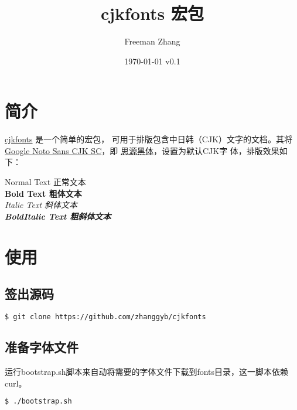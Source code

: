 \documentclass[oneside,final]{article}
\begin{document}
\title{cjkfonts 宏包}
\author{Freeman Zhang}
\date{\today{} v0.1}

\maketitle

\section{简介}

\href{https://github.com/zhanggyb/cjkfonts}{cjkfonts} 是一个简单的\XeLaTeX{}宏包，
可用于排版包含中日韩（CJK）文字的文档。其将
\href{https://www.google.com/get/noto/#sans-hans}{Google Noto Sans CJK SC}，即
\href{https://github.com/adobe-fonts/source-han-sans}{思源黑体}，设置为默认CJK字
体，排版效果如下：

\begin{center}
  Normal Text {\NotoSansSC 正常文本} \\
  \vspace{1em}
  \textbf{Bold Text {\NotoSansSC 粗体文本}} \\
  \vspace{1em}
  \textit{Italic Text {\NotoSansSC 斜体文本}} \\
  \vspace{1em}
  \textbf{\textit{BoldItalic Text {\NotoSansSC 粗斜体文本}}}
\end{center}

\section{使用}

\subsection{签出源码}

\begin{lstlisting}[language=sh]
  $ git clone https://github.com/zhanggyb/cjkfonts
\end{lstlisting}

\subsection{准备字体文件}

运行bootstrap.sh脚本来自动将需要的字体文件下载到fonts目录，这一脚本依赖curl。

\begin{lstlisting}[language=sh]
  $ ./bootstrap.sh
\end{lstlisting}
\end{document}
